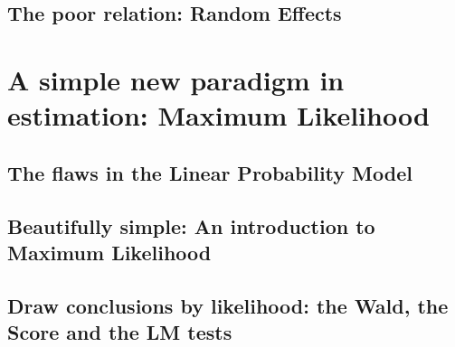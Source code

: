 \documentclass[11pt,fullpage]{book}
\begin{document}
\chapter{The poor relation: Random Effects}

\part{A simple new paradigm in estimation: Maximum Likelihood}
\chapter{The flaws in the Linear Probability Model}
\chapter{Beautifully simple: An introduction to Maximum Likelihood}
\chapter{Draw conclusions by likelihood: the Wald, the Score and the LM tests}





\end{document}
